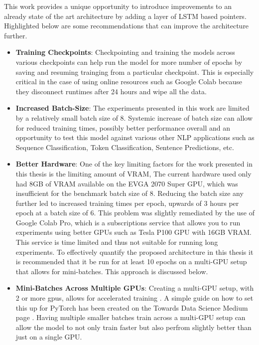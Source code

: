 \documentclass[a4paper,12pt]{report}
\begin{document}
    This work provides a unique opportunity to introduce improvements to an already state of the art architecture by adding a layer of LSTM based pointers. Highlighted below are some recommendations that can improve the architecture further.

    \begin{itemize}

    	\item \textbf{Training Checkpoints}: Checkpointing and training the models across various checkpoints can help run the model for more number of epochs by saving and resuming trainging from a particular checkpoint. This is especially critical in the case of using online resources such as Google Colab because they disconnect runtimes after 24 hours and wipe all the data.

    	\item \textbf{Increased Batch-Size}: The experiments presented in this work are limited by a relatively small batch size of 8. Systemic increase of batch size can allow for reduced training times, possibly better performance overall and an opportunity to test this model against various other NLP applications such as Sequence Classification, Token Classification, Sentence Predictions, etc.

    	\item \textbf{Better Hardware}: One of the key limiting factors for the work presented in this thesis is the limiting amount of VRAM, The current hardware used only had 8GB of VRAM available on the EVGA 2070 Super GPU, which was insufficient for the benchmark batch size of 8. Reducing the batch size any further led to increased training times per epoch, upwards of 3 hours per epoch at a batch size of 6. This problem was slightly remediated by the use of Google Colab Pro, which is a subscriptions service that allows you to run experiments using better GPUs such as Tesla P100 GPU with 16GB VRAM. This service is time limited and thus not suitable for running long experiments. To effectively quantify the proposed architecture in this thesis it is recommended that it be run for at least 10 epochs on a multi-GPU setup that allows for mini-batches. This approach is discussed below.

    	\item \textbf{Mini-Batches Across Multiple GPUs}: Creating a multi-GPU setup, with 2 or more gpus, allows for accelerated training \citep{multigpu1}. A simple guide on how to set this up for PyTorch has been created on the Towards Data Science Medium page \citep{multigpu2}. Having multiple smaller batches train across a multi-GPU setup can allow the model to not only train faster but also perfrom slightly better than just on a single GPU.


\end{itemize}
\end{document}
